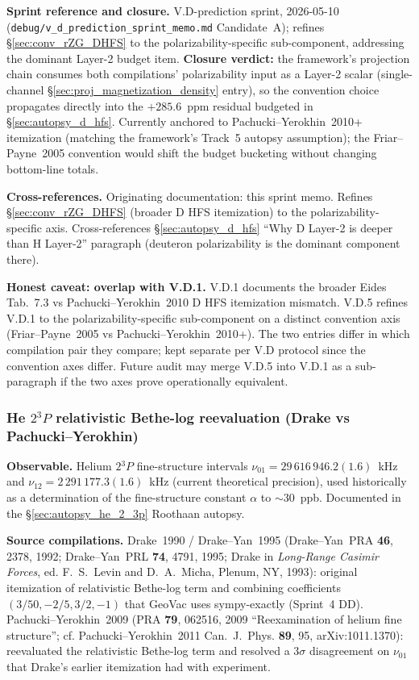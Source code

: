 \documentclass[11pt]{article}
\begin{document}
\textbf{Sprint reference and closure.}  V.D-prediction sprint, 2026-05-10
(\texttt{debug/v\_d\_prediction\_sprint\_memo.md} Candidate~A); refines
\S\ref{sec:conv_rZG_DHFS} to the polarizability-specific sub-component,
addressing the dominant Layer-2 budget item.  \textbf{Closure verdict:}
the framework's projection chain consumes both compilations' polarizability
input as a Layer-2 scalar (single-channel
\S\ref{sec:proj_magnetization_density} entry), so the convention
choice propagates directly into the $+285.6$~ppm residual budgeted in
\S\ref{sec:autopsy_d_hfs}.  Currently anchored to Pachucki--Yerokhin~2010+
itemization (matching the framework's Track~5 autopsy assumption); the
Friar--Payne~2005 convention would shift the budget bucketing without
changing bottom-line totals.

\textbf{Cross-references.}  Originating documentation: this sprint memo.
Refines \S\ref{sec:conv_rZG_DHFS} (broader D HFS itemization) to the
polarizability-specific axis.  Cross-references
\S\ref{sec:autopsy_d_hfs} ``Why D Layer-2 is deeper than H Layer-2''
paragraph (deuteron polarizability is the dominant component there).

\textbf{Honest caveat: overlap with V.D.1.}  V.D.1 documents the
broader Eides Tab.~7.3 vs Pachucki--Yerokhin~2010 D HFS itemization
mismatch.  V.D.5 refines V.D.1 to the polarizability-specific
sub-component on a distinct convention axis (Friar--Payne~2005 vs
Pachucki--Yerokhin~2010+).  The two entries differ in which
compilation pair they compare; kept separate per V.D protocol since
the convention axes differ.  Future audit may merge V.D.5 into V.D.1
as a sub-paragraph if the two axes prove operationally equivalent.

\subsubsection{He $2{}^3P$ relativistic Bethe-log reevaluation (Drake vs Pachucki--Yerokhin)}
\label{sec:conv_he_bethe_log}

\textbf{Observable.}  Helium $2{}^3P$ fine-structure intervals
$\nu_{01} = 29\,616\,946.2(1.6)$~kHz and $\nu_{12} =
2\,291\,177.3(1.6)$~kHz (current theoretical precision), used
historically as a determination of the fine-structure constant
$\alpha$ to $\sim 30$~ppb.  Documented in the
\S\ref{sec:autopsy_he_2_3p} Roothaan autopsy.

\textbf{Source compilations.}  Drake~1990 / Drake--Yan~1995
(Drake--Yan~PRA \textbf{46}, 2378, 1992; Drake--Yan~PRL \textbf{74},
4791, 1995; Drake in \emph{Long-Range Casimir Forces}, ed. F.~S.~Levin
and D.~A.~Micha, Plenum, NY, 1993): original itemization of relativistic
Bethe-log term and combining coefficients $(3/50, -2/5, 3/2, -1)$
that GeoVac uses sympy-exactly (Sprint~4 DD).
Pachucki--Yerokhin~2009 (PRA \textbf{79}, 062516, 2009 ``Reexamination
of helium fine structure''; cf. Pachucki--Yerokhin~2011 Can.~J.~Phys.
\textbf{89}, 95, arXiv:1011.1370): reevaluated the relativistic
Bethe-log term and resolved a 3$\sigma$ disagreement on $\nu_{01}$
that Drake's earlier itemization had with experiment.
\end{document}
